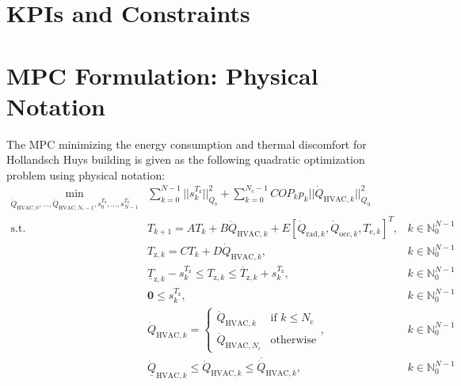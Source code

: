 \documentclass[10pt]{extarticle}
\begin{document}
\section{KPIs and Constraints}\label{sec:variables}


\section{MPC Formulation: Physical Notation}\label{sec:physical_notation}




The MPC minimizing  the energy consumption and  thermal discomfort 
for Hollandsch Huys building is given as the following quadratic optimization problem using physical notation:
\begin{subequations}
\label{eq:mpc_general}
\begin{align}
 \min_{\dot{Q}_{\text{HVAC},0}, \ldots, \dot{Q}_{\text{HVAC},{N_{\text{c}}-1}},
 s^{T_{\text{z}}}_0, \ldots, s^{T_{\text{z}}}_{N-1}} & \sum_{k=0}^{N-1}  
 || s^{T_{\text{z}}}_k ||_{Q_\text{s}}^2 +  \sum_{k=0}^{N_{\text{c}}-1} COP_k p_k ||\dot{Q}_{\text{HVAC},k} ||_{Q_\text{u}}^2  &
 \label{eq:mpc_general:cost}\\
  \text{s.t.} \ & T_{k+1} = A T_k+ B \dot{Q}_{\text{HVAC},k} +E [\dot{Q}_{\text{rad},k}, \dot{Q}_{\text{occ},k}, T_{\text{e},k}]^T, & k \in \mathbb{N}_{0}^{N-1} \label{eq:mpc_general:x} \\
  & T_{\text{z},k} = C T_k + D \dot{Q}_{\text{HVAC},k}, & k \in \mathbb{N}_{0}^{N-1} \label{eq:mpc_general:y} \\
  & \underline{T}_{\text{z},k} - s^{T_{\text{z}}}_k \le T_{\text{z},k} \le \overline{T}_{\text{z},k} + s^{T_{\text{z}}}_k, & k \in \mathbb{N}_{0}^{N-1} \label{eq:mpc_general:zone} \\
   & \mathbf{0} \le s^{T_{\text{z}}}_k  ,  & k \in \mathbb{N}_{0}^{N-1} \label{eq:mpc_general:lb_sk}\\
    & \dot{Q}_{\text{HVAC},k} =  \begin{cases}
    \dot{Q}_{\text{HVAC},k} & \text{if } k \leq N_{\text{c}}\\
   \dot{Q}_{\text{HVAC},N_{\text{c}}}     & \text{otherwise}   \end{cases}, & k \in \mathbb{N}_{0}^{N-1} \label{eq:mpc_general:move_block} \\
  &  \underline{\dot{Q}}_{\text{HVAC},k} \le \dot{Q}_{\text{HVAC},k} \le \overline{\dot{Q}}_{\text{HVAC},k},  & k \in \mathbb{N}_{0}^{N-1} \label{eq:mpc_general:ub}\\

\end{align}
\end{subequations}
\end{document}
